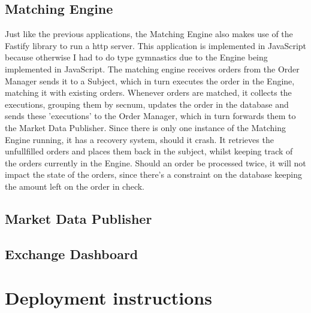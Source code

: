 \documentclass{article}
\begin{document}
\subsection{Matching Engine}
Just like the previous applications, the Matching Engine also makes use of the Fastify library to run a http server. This application is implemented in JavaScript because otherwise I had to do type gymnastics due to the Engine being implemented in JavaScript.
The matching engine receives orders from the Order Manager sends it to a Subject, which in turn executes the order in the Engine,
matching it with existing orders.
Whenever orders are matched, it collects the executions, grouping them by secnum, updates the order in the database and sends these 'executions' to the Order Manager, which in turn forwards them to the Market Data Publisher.
Since there is only one instance of the Matching Engine running, it has a recovery system, should it crash.
It retrieves the unfullfilled orders and places them back in the subject, whilst keeping track of the orders currently in the Engine.
Should an order be processed twice, it will not impact the state of the orders, since there's a constraint on the database keeping the amount left on the order in check.
\subsection{Market Data Publisher}

\subsection{Exchange Dashboard}
\section{Deployment instructions}
\end{document}
